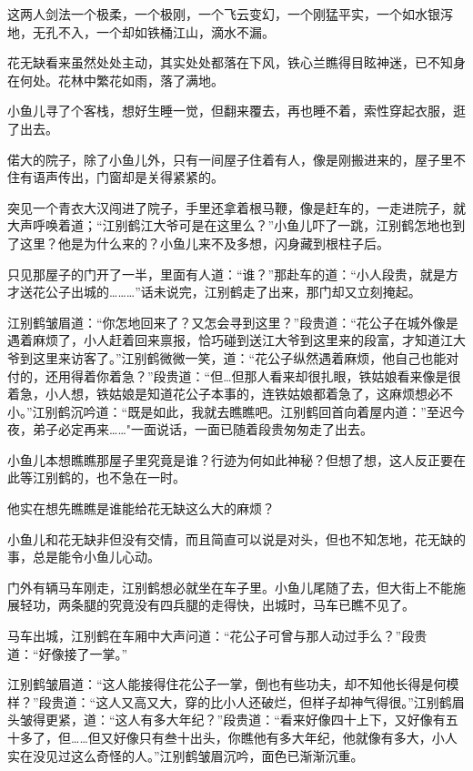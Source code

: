 \documentclass[12pt,oneside]{book}
\begin{document}
这两人剑法一个极柔，一个极刚，一个飞云变幻，一个刚猛平实，一个如水银泻地，无孔不入，一个却如铁桶江山，滴水不漏。

花无缺看来虽然处处主动，其实处处都落在下风，铁心兰瞧得目眩神迷，已不知身在何处。花林中繁花如雨，落了满地。

小鱼儿寻了个客栈，想好生睡一觉，但翻来覆去，再也睡不着，索性穿起衣服，逛了出去。

偌大的院子，除了小鱼儿外，只有一间屋子住着有人，像是刚搬进来的，屋子里不住有语声传出，门窗却是关得紧紧的。

突见一个青衣大汉闯进了院子，手里还拿着根马鞭，像是赶车的，一走进院子，就大声呼唤着道；``江别鹤江大爷可是在这里么？''小鱼儿吓了一跳，江别鹤怎地也到了这里？他是为什么来的？小鱼儿来不及多想，闪身藏到根柱子后。

只见那屋子的门开了一半，里面有人道：``谁？''那赴车的道：``小人段贵，就是方才送花公子出城的\ldots\ldots\ldots{}''话未说完，江别鹤走了出来，那门却又立刻掩起。

江别鹤皱眉道：``你怎地回来了？又怎会寻到这里？''段贵道：``花公子在城外像是遇着麻烦了，小人赶着回来禀报，恰巧碰到送江大爷到这里来的段富，才知道江大爷到这里来访客了。''江别鹤微微一笑，道：``花公子纵然遇着麻烦，他自己也能对付的，还用得着你着急？''段贵道：``但\ldots 但那人看来却很扎眼，铁姑娘看来像是很着急，小人想，铁姑娘是知道花公子本事的，连铁姑娘都着急了，这麻烦想必不小。''江别鹤沉吟道：``既是如此，我就去瞧瞧吧。江别鹤回首向着屋内道：''至迟今夜，弟子必定再来\ldots\ldots"一面说话，一面已随着段贵匆匆走了出去。

小鱼儿本想瞧瞧那屋子里究竟是谁？行迹为何如此神秘？但想了想，这人反正要在此等江别鹤的，也不急在一时。

他实在想先瞧瞧是谁能给花无缺这么大的麻烦？

小鱼儿和花无缺非但没有交情，而且简直可以说是对头，但也不知怎地，花无缺的事，总是能令小鱼儿心动。

门外有辆马车刚走，江别鹤想必就坐在车子里。小鱼儿尾随了去，但大街上不能施展轻功，两条腿的究竟没有四兵腿的走得快，出城时，马车已瞧不见了。

马车出城，江别鹤在车厢中大声问道：``花公子可曾与那人动过手么？''段贵道：``好像接了一掌。''

江别鹤皱眉道：``这人能接得住花公子一掌，倒也有些功夫，却不知他长得是何模样？''段贵道：``这人又高又大，穿的比小人还破烂，但样子却神气得很。''江别鹤眉头皱得更紧，道：``这人有多大年纪？''段贵道：``看来好像四十上下，又好像有五十多了，但\ldots\ldots 但又好像只有叁十出头，你瞧他有多大年纪，他就像有多大，小人实在没见过这么奇怪的人。''江别鹤皱眉沉吟，面色已渐渐沉重。
\end{document}
